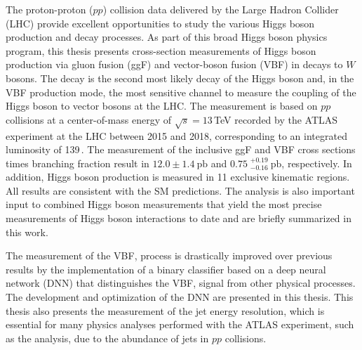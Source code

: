 
The proton-proton ($pp$) collision data delivered by the Large Hadron Collider (LHC) provide excellent opportunities to study the various Higgs boson production and decay processes.
As part of this broad Higgs boson physics program, this thesis presents cross-section measurements of Higgs boson production via gluon fusion (ggF) and vector-boson fusion (VBF) in decays to $W$ bosons.
The \HWW decay is the second most likely decay of the Higgs boson and, in the VBF production mode, the most sensitive channel to measure the coupling of the Higgs boson to vector bosons at the LHC.
The measurement is based on $pp$ collisions at a center-of-mass energy of $\sqrt{s} = 13\,$TeV recorded by the ATLAS experiment at the LHC between 2015 and 2018, corresponding to an integrated luminosity of 139\,\ifb.
The measurement of the inclusive ggF and VBF cross sections times branching fraction result in $12.0 \pm 1.4~\mathrm{pb}$ and $0.75\;^{+0.19}_{-0.16}~\mathrm{pb}$, respectively.
In addition, Higgs boson production is measured in 11 exclusive kinematic regions. All results are consistent with the SM predictions.
The analysis is also important input to combined Higgs boson measurements that yield the most precise measurements of Higgs boson interactions to date and are briefly summarized in this work. 

The measurement of the VBF, \HWW process is drastically improved over previous results by the implementation of a binary classifier based on a deep neural network (DNN) that distinguishes the VBF, \HWW signal from other physical processes. 
The development and optimization of the DNN are presented in this thesis. 
This thesis also presents the measurement of the jet energy resolution, which is essential for many physics analyses performed with the ATLAS experiment, such as the \HWW analysis, due to the abundance of jets in $pp$ collisions.

